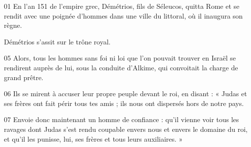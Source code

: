 01 En l’an 151 de l’empire grec, Démétrios, fils de Séleucos, quitta Rome et se rendit avec une poignée d’hommes dans une ville du littoral, où il inaugura son règne.

Démétrios s’assit sur le trône royal.

05 Alors, tous les hommes sans foi ni loi que l’on pouvait trouver en Israël se rendirent auprès de lui, sous la conduite d’Alkime, qui convoitait la charge de grand prêtre.

06 Ils se mirent à accuser leur propre peuple devant le roi, en disant : « Judas et ses frères ont fait périr tous tes amis ; ils nous ont dispersés hors de notre pays.

07 Envoie donc maintenant un homme de confiance : qu’il vienne voir tous les ravages dont Judas s’est rendu coupable envers nous et envers le domaine du roi, et qu’il les punisse, lui, ses frères et tous leurs auxiliaires. »